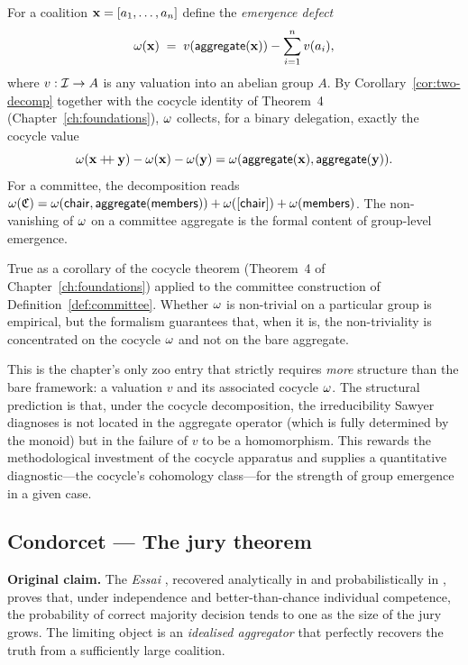 \formalclaim
For a coalition $\mathbf{x} = [a_1, \ldots, a_n]$ define the
\emph{emergence defect}
\[
  \omega(\mathbf{x}) \;=\; v(\mathsf{aggregate}(\mathbf{x})) - \sum_{i=1}^{n} v(a_i),
\]
where $v : \mathcal{I} \to A$ is any valuation into an abelian group $A$.
By Corollary~\ref{cor:two-decomp} together with the cocycle identity
of Theorem~4 (Chapter~\ref{ch:foundations}), $\omega$ collects, for a
binary delegation, exactly the cocycle value
\[
  \omega(\mathbf{x} \mathbin{+\!\!+} \mathbf{y}) - \omega(\mathbf{x}) - \omega(\mathbf{y}) = \omega(\mathsf{aggregate}(\mathbf{x}),
  \mathsf{aggregate}(\mathbf{y})).
\]
For a committee, the decomposition reads $\omega(\mathfrak{C}) =
\omega(\mathsf{chair}, \mathsf{aggregate}(\mathsf{members})) + \omega([\mathsf{chair}]) +
\omega(\mathsf{members})$. The non-vanishing of $\omega$ on a committee
aggregate is the formal content of group-level emergence.

\formalstatus
True as a corollary of the cocycle theorem (Theorem~4 of
Chapter~\ref{ch:foundations}) applied to the committee construction
of Definition~\ref{def:committee}. Whether $\omega$ is non-trivial
on a particular group is empirical, but the formalism guarantees
that, when it is, the non-triviality is concentrated on the cocycle
$\omega$ and not on the bare aggregate.

\litcomment
This is the chapter's only zoo entry that strictly requires
\emph{more} structure than the bare framework: a valuation $v$ and
its associated cocycle $\omega$. The structural prediction is that,
under the cocycle decomposition, the irreducibility Sawyer
diagnoses is not located in the aggregate operator (which is fully
determined by the monoid) but in the failure of $v$ to be a
homomorphism. This rewards the methodological investment of the
cocycle apparatus and supplies a quantitative diagnostic---the
cocycle's cohomology class---for the strength of group emergence in
a given case.

\subsection*{Condorcet --- The jury theorem}

\begin{zooentry*}\end{zooentry*}

\textbf{Original claim.} The \emph{Essai}
\cite{Condorcet1785}, recovered analytically in
\cite{BlackCondorcet1958} and probabilistically in
\cite{YoungCondorcet1988}, proves that, under independence and
better-than-chance individual competence, the probability of correct
majority decision tends to one as the size of the jury grows. The
limiting object is an \emph{idealised aggregator} that perfectly
recovers the truth from a sufficiently large coalition.

